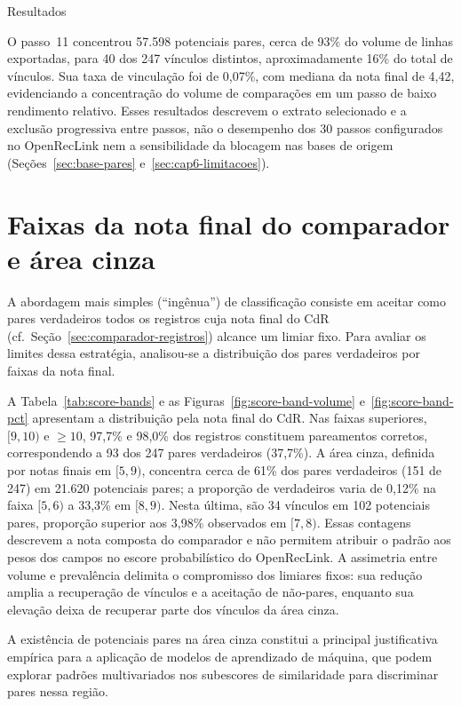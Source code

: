 \begin{chapter}{Resultados}


O passo~11 concentrou 57.598 potenciais pares, cerca de 93\% do volume de linhas exportadas, para 40 dos 247 vínculos distintos, aproximadamente 16\% do total de vínculos. Sua taxa de vinculação foi de 0,07\%, com mediana da nota final de 4,42, evidenciando a concentração do volume de comparações em um passo de baixo rendimento relativo. Esses resultados descrevem o extrato selecionado e a exclusão progressiva entre passos, não o desempenho dos 30 passos configurados no OpenRecLink nem a sensibilidade da blocagem nas bases de origem (Seções~\ref{sec:base-pares} e~\ref{sec:cap6-limitacoes}).

\section{Faixas da nota final do comparador e área cinza}
\label{sec:cap5-faixas-escore}

A abordagem mais simples (``ingênua'') de classificação consiste em aceitar como pares verdadeiros todos os registros cuja nota final do CdR (cf.\ Seção~\ref{sec:comparador-registros}) alcance um limiar fixo. Para avaliar os limites dessa estratégia, analisou-se a distribuição dos pares verdadeiros por faixas da nota final.

A Tabela~\ref{tab:score-bands} e as Figuras~\ref{fig:score-band-volume} e~\ref{fig:score-band-pct} apresentam a distribuição pela nota final do CdR. Nas faixas superiores, $[9,10)$ e $\geq10$, 97,7\% e 98,0\% dos registros constituem pareamentos corretos, correspondendo a 93 dos 247 pares verdadeiros (37,7\%). A área cinza, definida por notas finais em $[5,9)$, concentra cerca de 61\% dos pares verdadeiros (151 de 247) em 21.620 potenciais pares; a proporção de verdadeiros varia de 0,12\% na faixa $[5,6)$ a 33,3\% em $[8,9)$. Nesta última, são 34 vínculos em 102 potenciais pares, proporção superior aos 3,98\% observados em $[7,8)$. Essas contagens descrevem a nota composta do comparador e não permitem atribuir o padrão aos pesos dos campos no escore probabilístico do OpenRecLink. A assimetria entre volume e prevalência delimita o compromisso dos limiares fixos: sua redução amplia a recuperação de vínculos e a aceitação de não-pares, enquanto sua elevação deixa de recuperar parte dos vínculos da área cinza.

A existência de potenciais pares na área cinza constitui a principal justificativa empírica para a aplicação de modelos de aprendizado de máquina, que podem explorar padrões multivariados nos subescores de similaridade para discriminar pares nessa região.


\end{chapter}
